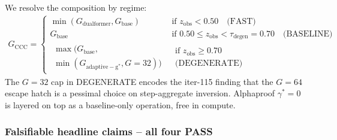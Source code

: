 We resolve the composition by regime:
\begin{align}
G_{\mathrm{CCC}} =
  \begin{cases}
    \min(G_{\mathrm{dualformer}}, G_{\mathrm{base}}) & \text{if } z_{\mathrm{obs}} < 0.50 \quad \text{(FAST)} \\
    G_{\mathrm{base}} & \text{if } 0.50 \leq z_{\mathrm{obs}} < \tau_{\mathrm{degen}}=0.70 \quad \text{(BASELINE)} \\
    \begin{gathered}
      \max\!\bigl(G_{\mathrm{base}},\\[-2pt]
      \min(G_{\mathrm{adaptive-g^*}}, G=32)\bigr)
    \end{gathered} & \substack{\text{if } z_{\mathrm{obs}} \geq 0.70\\\text{(DEGENERATE)}}
  \end{cases}
\end{align}
The $G=32$ cap in DEGENERATE encodes the iter-115 finding that the
$G=64$ escape hatch is a pessimal choice on step-aggregate inversion.
Alphaproof $\gamma^*=0$ is layered on top as a baseline-only operation,
free in compute.

\subsubsection*{Falsifiable headline claims -- all four PASS}

